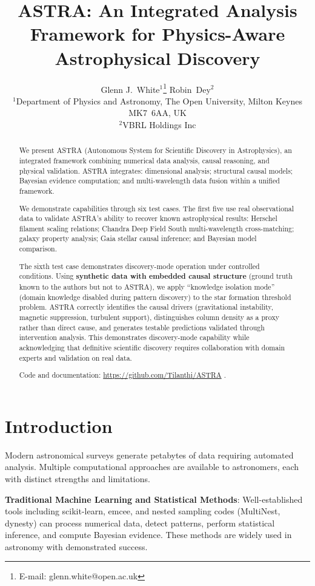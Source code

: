 \documentclass[usenatbib]{rasti}
\title[ASTRA: Integrated Analysis Framework for Astrophysics]{ASTRA: An Integrated Analysis Framework for Physics-Aware Astrophysical Discovery}
\author[White \& Dey]{
Glenn J.~White$^{1}$\thanks{E-mail: glenn.white@open.ac.uk}
Robin~Dey$^{2}$\\
$^{1}$Department of Physics and Astronomy, The Open University, Milton Keynes MK7~6AA, UK\\
$^{2}$VBRL Holdings Inc
}
\begin{document}

\maketitle

\label{firstpage}

\begin{abstract}
We present ASTRA (Autonomous System for Scientific Discovery in Astrophysics), an integrated framework combining numerical data analysis, causal reasoning, and physical validation. ASTRA integrates: dimensional analysis; structural causal models; Bayesian evidence computation; and multi-wavelength data fusion within a unified framework.

We demonstrate capabilities through six test cases. The first five use real observational data to validate ASTRA's ability to recover known astrophysical results: Herschel filament scaling relations; Chandra Deep Field South multi-wavelength cross-matching; galaxy property analysis; Gaia stellar causal inference; and Bayesian model comparison.

The sixth test case demonstrates discovery-mode operation under controlled conditions. Using \textbf{synthetic data with embedded causal structure} (ground truth known to the authors but not to ASTRA), we apply ``knowledge isolation mode'' (domain knowledge disabled during pattern discovery) to the star formation threshold problem. ASTRA correctly identifies the causal drivers (gravitational instability, magnetic suppression, turbulent support), distinguishes column density as a proxy rather than direct cause, and generates testable predictions validated through intervention analysis. This demonstrates discovery-mode capability while acknowledging that definitive scientific discovery requires collaboration with domain experts and validation on real data.

Code and documentation: \url{https://github.com/Tilanthi/ASTRA} \cite{astra_github}.
\end{abstract}

\section{Introduction}

Modern astronomical surveys generate petabytes of data requiring automated analysis. Multiple computational approaches are available to astronomers, each with distinct strengths and limitations.

\textbf{Traditional Machine Learning and Statistical Methods}: Well-established tools including scikit-learn, emcee, and nested sampling codes (MultiNest, dynesty) can process numerical data, detect patterns, perform statistical inference, and compute Bayesian evidence. These methods are widely used in astronomy with demonstrated success.
\end{document}
